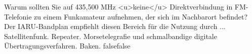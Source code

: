     {Warum sollten Sie auf 435,500 MHz <u>keine</u> Direktverbindung in FM-Telefonie zu einem Funkamateur aufnehmen, der sich im Nachbarort befindet? Der IARU-Bandplan empfiehlt diesen Bereich für die Nutzung durch ...}
    {Satellitenfunk.}
    {Repeater.}
    {Morsetelegrafie und schmalbandige digitale Übertragungsverfahren.}
    {Baken.}
    {false}{false}